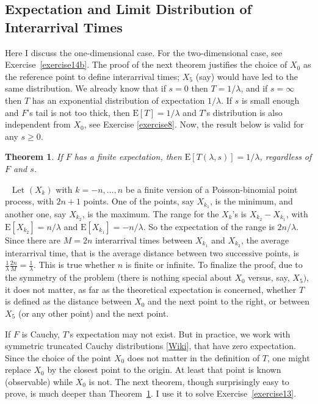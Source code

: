 \documentclass[10pt]{article}
\newtheorem{theorem}{Theorem}[section]
\newenvironment{proof}[1][Proof]{\begin{trivlist}
\item[\hskip \labelsep {\bfseries #1}]}{\end{trivlist}}
\newcommand{\qed}{\nobreak \ifvmode \relax \else
      \ifdim\lastskip<1.5em \hskip-\lastskip
      \hskip1.5em plus0em minus0.5em \fi \nobreak
      \vrule height0.75em width0.5em depth0.25em\fi}
\begin{document}
\subsection{Expectation and Limit Distribution of Interarrival Times}

Here I discuss the one-dimensional case. For the two-dimensional case, see Exercise~\ref{exercise14b}. The proof of the next theorem justifies the choice of $X_0$ as the reference point to define interarrival times; $X_5$ (say) would have led to the same distribution. We already know that if $s=0$ then $T=1/\lambda$, and if $s=\infty$ then $T$ has an exponential distribution of expectation $1/\lambda$. If $s$ is small enough and $F$'s tail is not too thick, then $\mbox{E}[T]=1/\lambda$ and $T$'s distribution is also independent from $X_0$, see Exercise \ref{exercise8}. Now, the result below is valid for any $s\geq 0$.

\begin{theorem}
\label{et}
If  $F$ has a finite expectation, then $\mbox{E}[T(\lambda,s)]=1/\lambda$, regardless of $F$ and $s$.
\end{theorem}
\begin{proof}
$ $ \newline \
Let $(X_k)$ with $k=-n,\dots,n$ be a finite version of a Poisson-binomial point process, with $2n+1$ points. 
One of the points, say $X_{k_1}$, is the minimum, and another one, say $X_{k_2}$, is the maximum.  The range for the $X_k$'s is $X_{k_2}-X_{k_1}$,
with $\mbox{E}[X_{k_2}]=n/\lambda$ and $\mbox{E}[X_{k_1}]=-n/\lambda$. So the expectation of the range is $2n/\lambda$. Since there are $M=2n$ interarrival times between $X_{k_1}$ and $X_{k_2}$, the average interarrival time, that is the average distance between two successive points, is $\frac{1}{\lambda}\frac{2n}{M}=\frac{1}{\lambda}$. This is true whether $n$ is finite or infinite. To finalize the proof, due to the symmetry of the problem (there is nothing special about $X_0$ 
versus, say, $X_5)$, it does not matter, as far as the theoretical expectation is concerned, whether $T$ is defined as the distance between $X_0$ and the next point to the right, or between $X_5$ (or any other point) and the next point.
\qed
\end{proof}

If $F$ is Cauchy, $T$'s expectation may not exist. But in practice, we work with symmetric \textcolor{index}{truncated} \textcolor{index}{Cauchy 
distributions}\index{Cauchy distribution}\index{distribution!Cauchy} [\href{https://en.wikipedia.org/wiki/Truncated_distribution}{Wiki}], that have zero expectation.  Since the choice of the point $X_0$ does not matter in the definition of $T$, one might replace $X_0$ by the closest point to the origin. At least that point is known (observable) while $X_0$ is not. The next theorem, 
though surprisingly easy to prove, is much deeper than Theorem~\ref{et}. I use it to solve Exercise~\ref{exercise13}.
\end{document}
